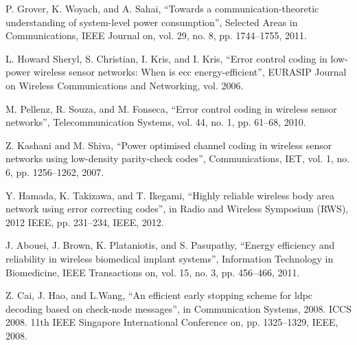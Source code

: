 \documentclass[3p,times,procedia]{elsarticle}
\begin{document}
\begin{thebibliography}{1}
P. Grover, K. Woyach, and A. Sahai, ``Towards a communication-theoretic understanding of system-level power consumption'', Selected Areas in Communications, IEEE Journal on, vol. 29, no. 8, pp. 1744–1755, 2011.

L. Howard Sheryl, S. Christian, I. Kris, and I. Kris, ``Error control coding in low-power wireless sensor networks: When is ecc energy-efficient'', EURASIP Journal on Wireless Communications and Networking, vol. 2006.

M. Pellenz, R. Souza, and M. Fonseca, ``Error control coding in wireless sensor networks'', Telecommunication Systems, vol. 44, no. 1, pp. 61–68, 2010.

Z. Kashani and M. Shiva, ``Power optimised channel coding in wireless sensor networks using low-density parity-check codes'', Communications, IET, vol. 1, no. 6, pp. 1256–1262, 2007.

Y. Hamada, K. Takizawa, and T. Ikegami, ``Highly reliable wireless body area network using error correcting codes'', in Radio and Wireless Symposium (RWS), 2012 IEEE, pp. 231–234, IEEE, 2012.

J. Abouei, J. Brown, K. Plataniotis, and S. Pasupathy, ``Energy eﬃciency and reliability in wireless biomedical implant systems'', Information Technology in Biomedicine, IEEE Transactions on, vol. 15, no. 3, pp. 456–466, 2011.

Z. Cai, J. Hao, and L.Wang, ``An efficient early stopping scheme for ldpc decoding based on check-node messages'', in Communication Systems, 2008. ICCS 2008. 11th IEEE Singapore International Conference on, pp. 1325–1329, IEEE, 2008.

\end{thebibliography}
\end{document}

